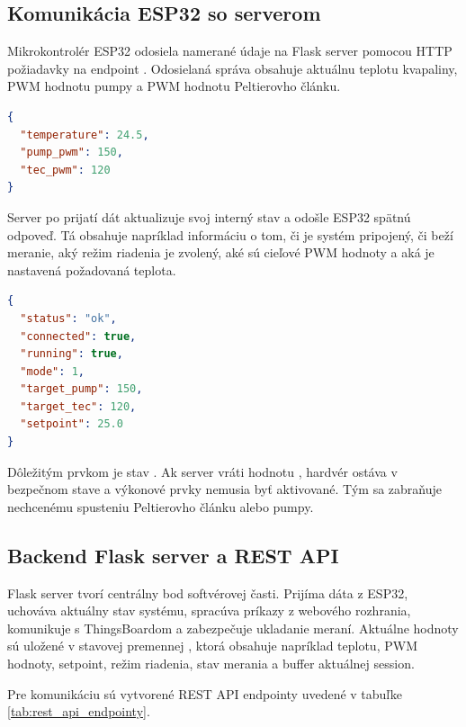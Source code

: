 \subsection{Komunikácia ESP32 so serverom}

Mikrokontrolér ESP32 odosiela namerané údaje na Flask server pomocou HTTP požiadavky 
na endpoint . Odosielaná správa obsahuje aktuálnu teplotu kvapaliny, 
PWM hodnotu pumpy a PWM hodnotu Peltierovho článku.

\begin{lstlisting}[language=json, caption={Príklad dát odosielaných z ESP32 na server}]
{
  "temperature": 24.5,
  "pump_pwm": 150,
  "tec_pwm": 120
}
\end{lstlisting}

Server po prijatí dát aktualizuje svoj interný stav a odošle ESP32 spätnú odpoveď. 
Tá obsahuje napríklad informáciu o tom, či je systém pripojený, či beží meranie, 
aký režim riadenia je zvolený, aké sú cieľové PWM hodnoty a aká je nastavená požadovaná teplota.

\begin{lstlisting}[language=json, caption={Príklad odpovede servera pre ESP32}]
{
  "status": "ok",
  "connected": true,
  "running": true,
  "mode": 1,
  "target_pump": 150,
  "target_tec": 120,
  "setpoint": 25.0
}
\end{lstlisting}

Dôležitým prvkom je stav . Ak server vráti hodnotu , 
hardvér ostáva v bezpečnom stave a výkonové prvky nemusia byť aktivované. Tým sa zabraňuje 
nechcenému spusteniu Peltierovho článku alebo pumpy.

\subsection{Backend Flask server a REST API}

Flask server tvorí centrálny bod softvérovej časti. Prijíma dáta z ESP32, uchováva 
aktuálny stav systému, spracúva príkazy z webového rozhrania, komunikuje s ThingsBoardom a 
zabezpečuje ukladanie meraní. Aktuálne hodnoty sú uložené v stavovej premennej 
, ktorá obsahuje napríklad teplotu, PWM hodnoty, setpoint, režim riadenia, 
stav merania a buffer aktuálnej session.

Pre komunikáciu sú vytvorené REST API endpointy uvedené v tabuľke \ref{tab:rest_api_endpointy}.

